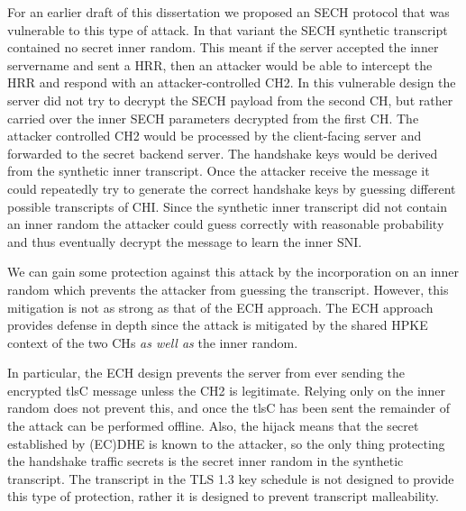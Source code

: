 For an earlier draft of this dissertation we proposed an \ac{SECH} protocol that was vulnerable to this type of attack.
In that variant the \ac{SECH} synthetic transcript contained
no secret inner random.
This meant if the
server accepted the inner servername and sent a \ac{HRR}, then an attacker would be able to intercept
the \ac{HRR} and respond with an attacker-controlled \ac{CH2}.
In this vulnerable design the server did
not try to decrypt the \ac{SECH} payload from the second \ac{CH},
but rather carried over the inner \ac{SECH} parameters decrypted from the first \ac{CH}.
The attacker controlled \ac{CH2}
would be processed by the client-facing server and forwarded to the secret backend server.
The handshake keys would be derived from the synthetic inner transcript.
Once the attacker receive the  message
it could repeatedly try to generate the correct handshake keys
by guessing different possible
transcripts of \ac{CHI}.
Since the synthetic inner transcript did not contain an inner random
the attacker could guess correctly with reasonable probability
and thus eventually decrypt the  message to learn the inner \ac{SNI}.

We can gain some protection
against this attack
by the incorporation on an inner random which prevents the attacker
from guessing the transcript.
However, this mitigation is not as strong as that of the \ac{ECH} approach.
The \ac{ECH} approach provides defense in depth since the attack is mitigated
by the shared \ac{HPKE} context of the two \ac{CH}s {\em as well as}
the inner random.

In particular, the \ac{ECH} design prevents the server from ever sending the encrypted
\ac{tlsC} message unless the \ac{CH2} is legitimate.
Relying only on the inner random does not prevent this,
and once the \ac{tlsC} has been sent the remainder of the
attack can be performed offline.
Also, the  hijack means that the secret established
by (\ac{EC})\ac{DHE} is known to the attacker, so the
only thing protecting the handshake traffic secrets
is the secret inner random in the synthetic transcript.
The transcript in the \ac{TLS} 1.3 key schedule is not designed
to provide this type of protection, rather it is designed
to prevent transcript malleability.

